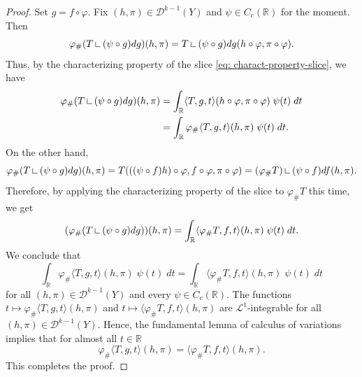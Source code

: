 \documentclass{amsart}
\numberwithin{equation}{section}
\newcommand{\R}{\mathbb{R}}
\newcommand{\leb}{\mathcal{L}}
\newcommand{\on}{\:\mbox{\rule{0.1ex}{1.2ex}\rule{1.1ex}{0.1ex}}\:}
\begin{document}
        \begin{proof}
            Set $g = f\circ \varphi$. Fix $(h,\pi) \in \mathcal{D}^{k-1}(Y)$ and $\psi \in C_c(\R)$ for the moment. Then
            $$\varphi_\#(T\on (\psi \circ g)dg)(h,\pi)= T\on (\psi\circ g)dg(h\circ \varphi,\pi\circ\varphi).$$
            Thus, by the characterizing property of the slice \eqref{eq: charact-property-slice}, we have
            \begin{align*}
                \varphi_\#(T\on (\psi \circ g)dg)(h,\pi) &=\int_{\R} \langle T, g, t \rangle(h\circ \varphi,\pi\circ\varphi) \; \psi(t) \; dt
                \\
                &= \int_{\R}\varphi_\#\langle T, g, t \rangle(h,\pi) \; \psi(t) \; dt.
            \end{align*}
            On the other hand,
            $$\varphi_\#(T\on (\psi \circ g)dg)(h,\pi) = T(((\psi\circ f)h)\circ \varphi, f \circ \varphi, \pi \circ \varphi)= (\varphi_\#T)\on(\psi\circ f)df (h,\pi).$$
            Therefore, by applying the characterizing property of the slice to $\varphi_\#T$ this time, we get
            \begin{equation*}\label{eq: slice-pushfwd-2}
                (\varphi_\#(T\on (\psi \circ g)dg))(h,\pi) = \int_{\R} \langle \varphi_\# T, f, t\rangle(h,\pi)\; \psi(t) \; dt.
            \end{equation*}
            We conclude that 
            $$\int_{\R}\varphi_\#\langle T, g, t \rangle(h,\pi) \; \psi(t) \; dt = \int_{\R} \langle \varphi_\# T, f, t\rangle(h,\pi)\; \psi(t) \; dt$$
            for all $(h,\pi) \in \mathcal{D}^{k-1}(Y)$ and every $\psi \in C_c(\R)$. The functions $t \mapsto \varphi_\#\langle T, g, t \rangle(h,\pi)$ and $t \mapsto \langle \varphi_\#T, f, t \rangle(h,\pi)$ are $\leb^1$-integrable for all $(h,\pi) \in \mathcal{D}^{k-1}(Y)$. Hence, the fundamental lemma of calculus of variations implies that for almost all $t \in \R$
            $$\varphi_\#\langle T, g, t \rangle(h,\pi) = \langle \varphi_\#T, f, t \rangle(h,\pi).$$
            This completes the proof.
        \end{proof}
        
\end{document}
